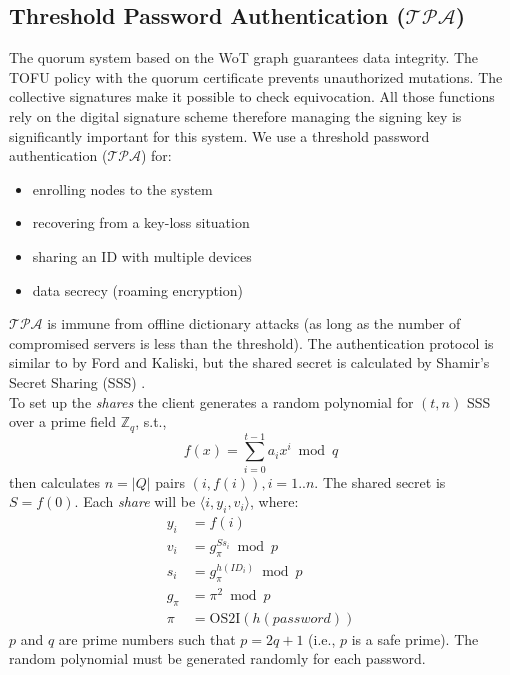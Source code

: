\subsection{Threshold Password Authentication ($\mathcal{TPA}$)}
\label{threshold}
The quorum system based on the WoT graph guarantees data
integrity. The TOFU policy with the quorum certificate prevents
unauthorized mutations. The collective signatures make it possible to
check equivocation. All those functions rely on the digital signature
scheme therefore managing the signing key is significantly
important for this system. We use a threshold password authentication
($\mathcal{TPA}$) for:
\begin{itemize}
\item enrolling nodes to the system
\item recovering from a key-loss situation
\item sharing an ID with multiple devices
\item data secrecy (roaming encryption)
\end{itemize}
$\mathcal{TPA}$ is immune from offline dictionary attacks (as long as
the number of compromised servers is less than the threshold). The
authentication protocol is similar to \cite{ford} by Ford and Kaliski,
but the shared secret is calculated by Shamir's Secret Sharing (SSS)
\cite{shamir}.\\

To set up the {\em shares} the client generates a random polynomial
for $(t, n)$ SSS over a prime field $\mathbb{Z}_q$, s.t.,
\[
  f(x) = \sum_{i=0}^{t-1}a_ix^i \bmod q
\]
then calculates $n=|Q|$ pairs $(i,f(i)), i = 1..n$. The shared secret
is $S = f(0)$. Each {\em share} will be $\langle i, y_i, v_i \rangle$,
where:
\begin{align*}
  y_i &= f(i) \\
  v_i &= g_{\pi}^{Ss_i} \bmod p \\
  s_i &= g_{\pi}^{h(ID_i)} \bmod p \\
  g_{\pi} &= \pi^2 \bmod p \\
  \pi &= \text{OS2I}(h(password))
\end{align*}
$p$ and $q$ are prime numbers such that $p = 2q + 1$ (i.e., $p$ is a
safe prime). The random polynomial must be generated randomly for each
password.\\

